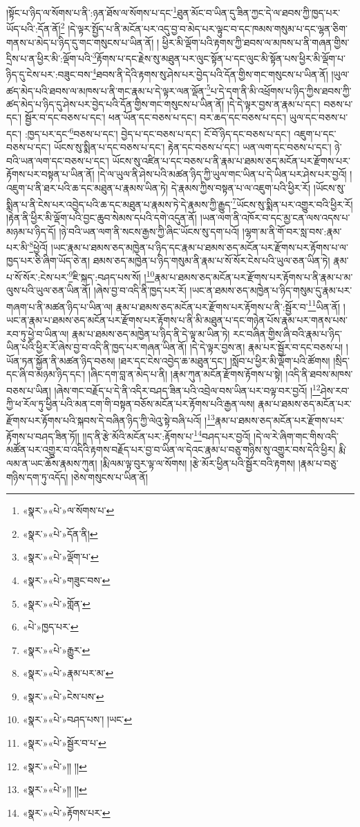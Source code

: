 །སྟོང་པ་ཉིད་ལ་སོགས་པ་ནི་:ཉན་ཐོས་ལ་སོགས་པ་དང་\footnote{«སྣར་»«པེ་»ལ་སོགས་པ་}ཐུན་མོང་བ་ཡིན་དུ་ཟིན་ཀྱང་དེ་ལ་ཐབས་ཀྱི་ཁྱད་པར་ཡོད་པའི་:དོན་ནོ།\footnote{«སྣར་»«པེ་»དོན་ནི།} །དེ་ལྟར་སྤྱོད་པ་ནི་མངོན་པར་འདུ་བྱ་བ་མེད་པར་ལྟུང་བ་དང་ཁམས་གསུམ་པ་དང་ལྷན་ཅིག་གནས་པ་མེད་པ་ཉིད་དུ་གང་གསུངས་པ་ཡིན་ནོ། །
ཕྱིར་མི་ལྡོག་པའི་རྟགས་ཀྱི་ཐབས་ལ་མཁས་པ་ནི་གཞན་གྱིས་དྲིས་པ་ན་ཕྱིར་མི་:ལྡོག་པའི་\footnote{«སྣར་»«པེ་»ལྡོག་པ་}རྟོགས་པ་དང་རྗེས་སུ་མཐུན་པར་ལུང་སྟོན་པ་དང་ལུང་མི་སྟོན་པས་ཕྱིར་མི་ལྡོག་པ་ཉིད་དུ་ངེས་པར་:བཟུང་བས་\footnote{«སྣར་»«པེ་»གཟུང་བས་}ཐབས་ནི་དེའི་རྟགས་སུ་ཤེས་པར་བྱེད་པའི་དོན་གྱིས་གང་གསུངས་པ་ཡིན་ནོ། །ཡུལ་ཚད་མེད་པའི་ཐབས་ལ་མཁས་པ་ནི་གང་རྣམ་པ་དེ་ལྟར་ལན་ལྡོན་\footnote{«སྣར་»«པེ་»གློན་}པ་དེ་དག་ནི་མི་འཕྲོགས་པ་ཉིད་ཀྱིས་ཐབས་ཀྱི་ཚད་མེད་པ་ཉིད་དུ་ཤེས་པར་བྱེད་པའི་དོན་གྱིས་གང་གསུངས་པ་ཡིན་ནོ། །དེ་དེ་ལྟར་བྱས་ན་རྣམ་པ་དང་། བཅས་པ་དང་། སྦྱོར་བ་དང་བཅས་པ་དང་། ཕན་ཡོན་དང་བཅས་པ་དང་། བར་ཆད་དང་བཅས་པ་དང་། ཡུལ་དང་བཅས་པ་དང་། :ཁྱད་པར་དང་\footnote{«པེ་»ཁྱད་པར་}བཅས་པ་དང་། བྱེད་པ་དང་བཅས་པ་དང་། ངོ་བོ་ཉིད་དང་བཅས་པ་དང་། འཇུག་པ་དང་བཅས་པ་དང་། ཡོངས་སུ་སྨིན་པ་དང་བཅས་པ་དང་། རྟེན་དང་བཅས་པ་དང་། ཡན་ལག་དང་བཅས་པ་དང་། ཉེ་བའི་ཡན་ལག་དང་བཅས་པ་དང་། ཡོངས་སུ་འཛིན་པ་དང་བཅས་པ་ནི་རྣམ་པ་ཐམས་ཅད་མངོན་པར་རྫོགས་པར་རྟོགས་པར་བསྟན་པ་ཡིན་ནོ། །དེ་ལ་ཡུལ་ནི་ཤེས་པའི་མཚན་ཉིད་ཀྱི་ཡུལ་གང་ཡིན་པ་དེ་ཡིན་པར་ཤེས་པར་བྱའོ། །འཇུག་པ་ནི་ཐར་པའི་ཆ་དང་མཐུན་པ་རྣམས་ཡིན་ཏེ། དེ་རྣམས་ཀྱིས་བསྟན་པ་ལ་འཇུག་པའི་ཕྱིར་རོ། །ཡོངས་སུ་སྨིན་པ་ནི་ངེས་པར་འབྱེད་པའི་ཆ་དང་མཐུན་པ་རྣམས་ཏེ་དེ་རྣམས་ཀྱི་རྒྱུད་\footnote{«སྣར་»«པེ་»རྒྱུར་}ཡོངས་སུ་སྨིན་པར་འགྱུར་བའི་ཕྱིར་རོ། །རྟེན་ནི་ཕྱིར་མི་ལྡོག་པའི་བྱང་ཆུབ་སེམས་དཔའི་དགེ་འདུན་ནོ། །ཡན་ལག་ནི་འཁོར་བ་དང་མྱ་ངན་ལས་འདས་པ་མཉམ་པ་ཉིད་དོ། །ཉེ་བའི་ཡན་ལག་ནི་སངས་རྒྱས་ཀྱི་ཞིང་ཡོངས་སུ་དག་པའོ། །ལྷག་མ་ནི་གོ་བར་སླ་བས་:རྣམ་པར་མི་\footnote{«སྣར་»«པེ་»རྣམ་པར་མ་}ཕྱེའོ། །ཡང་རྣམ་པ་ཐམས་ཅད་མཁྱེན་པ་ཉིད་དང་རྣམ་པ་ཐམས་ཅད་མངོན་པར་རྫོགས་པར་རྟོགས་པ་ལ་ཁྱད་པར་ཅི་ཞིག་ཡོད་ཅེ་ན། ཐམས་ཅད་མཁྱེན་པ་ཉིད་གསུམ་ནི་རྣམ་པ་སོ་སོར་ངེས་པའི་ཡུལ་ཅན་ཡིན་ཏེ། རྣམ་པ་སོ་སོར་:ངེས་པར་\footnote{«སྣར་»«པེ་»ངེས་པས་}ཇི་སྐད་:བཤད་པས་སོ། །\footnote{«སྣར་»«པེ་»བཤད་པས་། །ཡང་}རྣམ་པ་ཐམས་ཅད་མངོན་པར་རྫོགས་པར་རྟོགས་པ་ནི་རྣམ་པ་མ་ལུས་པའི་ཡུལ་ཅན་ཡིན་ནོ། །ཞེས་བྱ་བ་འདི་ནི་ཁྱད་པར་རོ། །ཡང་ན་ཐམས་ཅད་མཁྱེན་པ་ཉིད་གསུམ་དུ་རྣམ་པར་གཞག་པ་ནི་མཚན་ཉིད་པ་ཡིན་ལ། རྣམ་པ་ཐམས་ཅད་མངོན་པར་རྫོགས་པར་རྟོགས་པ་ནི་:སྦྱོར་བ་\footnote{«སྣར་»«པེ་»སྦྱོར་བ་པ་}ཡིན་ནོ། །ཡང་ན་རྣམ་པ་ཐམས་ཅད་མངོན་པར་རྫོགས་པར་རྟོགས་པ་ནི་མི་མཐུན་པ་དང་གཉེན་པོས་རྣམ་པར་གནས་པས་རབ་ཏུ་ཕྱེ་བ་ཡིན་ལ། རྣམ་པ་ཐམས་ཅད་མཁྱེན་པ་ཉིད་ནི་དེ་ལྟ་མ་ཡིན་ཏེ། རང་བཞིན་གྱིས་ཞི་བའི་རྣམ་པ་ཉིད་ཡིན་པའི་ཕྱིར་རོ་ཞེས་བྱ་བ་འདི་ནི་ཁྱད་པར་གཞན་ཡིན་ནོ། །དེ་དེ་ལྟར་བྱས་ན། རྣམ་པར་སྦྱོར་བ་དང་བཅས་པ། །ཡོན་ཏན་སྐྱོན་ནི་མཚན་ཉིད་བཅས། །ཐར་དང་ངེས་འབྱེད་ཆ་མཐུན་དང་། །སློབ་པ་ཕྱིར་མི་ལྡོག་པའི་ཚོགས། །སྲིད་དང་ཞི་བ་མཉམ་ཉིད་དང་། །ཞིང་དག་བླ་ན་མེད་པ་ནི། །རྣམ་ཀུན་མངོན་རྫོགས་རྟོགས་པ་སྟེ། །འདི་ནི་ཐབས་མཁས་བཅས་པ་ཡིན། །ཞེས་གང་བརྗོད་པ་དེ་ནི་འདིར་བཤད་ཟིན་པའི་འབྲེལ་བས་ཡིན་པར་བལྟ་བར་བྱའོ། །\footnote{«སྣར་»«པེ་»།། །།}ཤེས་རབ་ཀྱི་ཕ་རོལ་ཏུ་ཕྱིན་པའི་མན་ངག་གི་བསྟན་བཅོས་མངོན་པར་རྟོགས་པའི་རྒྱན་ལས། རྣམ་པ་ཐམས་ཅད་མངོན་པར་རྫོགས་པར་རྟོགས་པའི་སྐབས་དེ་བཞིན་ཉིད་ཀྱི་ལེའུ་སྟེ་བཞི་པའོ། །\footnote{«སྣར་»«པེ་»།། །།}རྣམ་པ་ཐམས་ཅད་མངོན་པར་རྫོགས་པར་རྟོགས་པ་བཤད་ཟིན་ཏོ།། །།ད་ནི་རྩེ་མོའི་མངོན་པར་:རྟོགས་པ་\footnote{«སྣར་»«པེ་»རྟོགས་པར་}བཤད་པར་བྱའོ། །དེ་ལ་རེ་ཞིག་གང་གིས་འདི་མཚོན་པར་འགྱུར་བ་འདིའི་རྟགས་བརྗོད་པར་བྱ་བ་ཡིན་ལ་དེའང་རྣམ་པ་བཅུ་གཉིས་སུ་འགྱུར་བས་དེའི་ཕྱིར། རྨི་ལམ་ན་ཡང་ཆོས་རྣམས་ཀུན། །རྨི་ལམ་ལྟ་བུར་ལྟ་ལ་སོགས། །རྩེ་མོར་ཕྱིན་པའི་སྦྱོར་བའི་རྟགས། །རྣམ་པ་བཅུ་གཉིས་དག་ཏུ་འདོད། །ཅེས་གསུངས་པ་ཡིན་ནོ། 